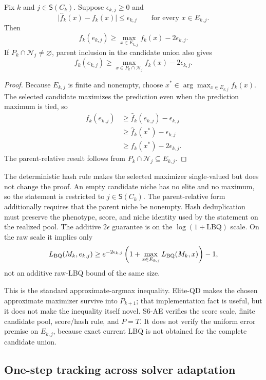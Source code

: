 \begin{proposition}
\label{prop:tracking-argmax}
Fix $k$ and $j\in\mathsf S(C_k)$.  Suppose $\epsilon_{k,j}\geq0$ and
\[
 \lvert\widehat f_k(x)-f_k(x)\rvert\leq\epsilon_{k,j}
 \qquad\text{for every }x\in E_{k,j}.
\]
Then
\[
 f_k(e_{k,j})\geq
 \max_{x\in E_{k,j}}f_k(x)-2\epsilon_{k,j}.
\]
If $P_k\cap\mathcal N_j\neq\varnothing$, parent inclusion in the candidate
union also gives
\[
 f_k(e_{k,j})\geq
 \max_{x\in P_k\cap\mathcal N_j}f_k(x)-2\epsilon_{k,j}.
\]
\end{proposition}

\begin{proof}
Because $E_{k,j}$ is finite and nonempty, choose
$x^*\in\arg\max_{x\in E_{k,j}}f_k(x)$.  The selected candidate maximizes the
prediction even when the prediction maximum is tied, so
\begin{align*}
 f_k(e_{k,j})
 &\geq \widehat f_k(e_{k,j})-\epsilon_{k,j}\\
 &\geq \widehat f_k(x^*)-\epsilon_{k,j}\\
 &\geq f_k(x^*)-2\epsilon_{k,j}.
\end{align*}
The parent-relative result follows from
$P_k\cap\mathcal N_j\subseteq E_{k,j}$.
\end{proof}

The deterministic hash rule makes the selected maximizer single-valued but
does not change the proof.  An empty candidate niche has no elite and no
maximum, so the statement is restricted to $j\in\mathsf S(C_k)$.  The
parent-relative form additionally requires that the parent niche be nonempty.
Hash deduplication must preserve the phenotype, score, and niche identity used
by the statement on the realized pool.  The additive $2\epsilon$ guarantee is
on the $\log(1+\mathrm{LBQ})$ scale.  On the raw scale it implies only
\[
 L_{\rm BQ}(M_k,e_{k,j})
 \geq e^{-2\epsilon_{k,j}}
       \left(1+\max_{x\in E_{k,j}}L_{\rm BQ}(M_k,x)\right)-1,
\]
not an additive raw-LBQ bound of the same size.

This is the standard approximate-argmax inequality.  Elite-QD makes the
chosen approximate maximizer survive into $P_{k+1}$; that implementation fact
is useful, but it does not make the inequality itself novel.  S6-AE verifies
the score scale, finite candidate pool, score/hash rule, and $P=T$.  It does
not verify the uniform error premise on $E_{k,j}$, because exact current LBQ
is not obtained for the complete candidate union.

\subsection{One-step tracking across solver adaptation}
 

